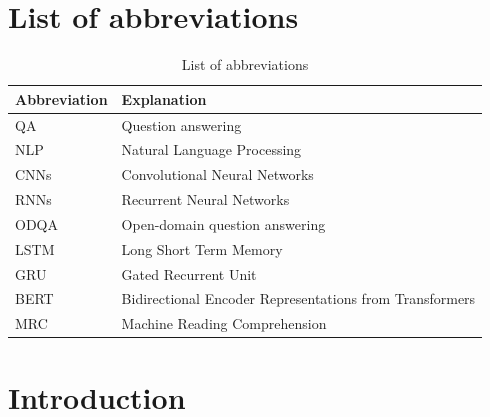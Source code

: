 \documentclass[12pt, sort&compress]{report}
\begin{document}
\chapter*{List of abbreviations}
\begin{table}[!htbp]
\caption{List of abbreviations}
\centering\begin{tabular}{p{.3\linewidth}p{.7\linewidth}}
	\toprule
	\textbf{Abbreviation} & \textbf{Explanation} \\
	\midrule
	QA & Question answering \\
	NLP & Natural Language Processing \\
	CNNs & Convolutional Neural Networks \\
	RNNs & Recurrent Neural Networks \\
	ODQA & Open-domain question answering \\
	LSTM & Long Short Term Memory \\
	GRU & Gated Recurrent Unit \\
	BERT & Bidirectional Encoder Representations from Transformers \\
	MRC & Machine Reading Comprehension \\
	\bottomrule
	\bottomrule
\end{tabular}
\label{table:0}
\end{table}
\listoffigures
{}
\listoftables
{}
\chapter{Introduction}
\label{chap:01}
\end{document}
